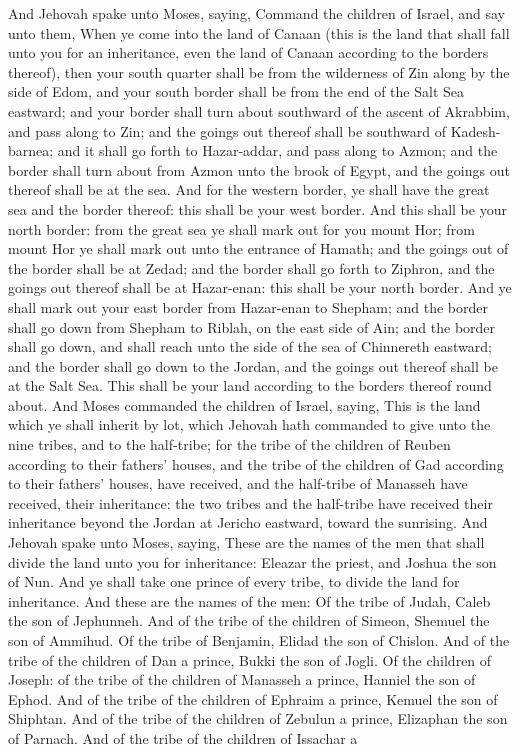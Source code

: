 And Jehovah spake unto Moses, saying, Command the children of Israel, and say unto them, When ye come into the land of Canaan (this is the land that shall fall unto you for an inheritance, even the land of Canaan according to the borders thereof), then your south quarter shall be from the wilderness of Zin along by the side of Edom, and your south border shall be from the end of the Salt Sea eastward; and your border shall turn about southward of the ascent of Akrabbim, and pass along to Zin; and the goings out thereof shall be southward of Kadesh-barnea; and it shall go forth to Hazar-addar, and pass along to Azmon; and the border shall turn about from Azmon unto the brook of Egypt, and the goings out thereof shall be at the sea.  And for the western border, ye shall have the great sea and the border thereof: this shall be your west border.  And this shall be your north border: from the great sea ye shall mark out for you mount Hor; from mount Hor ye shall mark out unto the entrance of Hamath; and the goings out of the border shall be at Zedad; and the border shall go forth to Ziphron, and the goings out thereof shall be at Hazar-enan: this shall be your north border.  And ye shall mark out your east border from Hazar-enan to Shepham; and the border shall go down from Shepham to Riblah, on the east side of Ain; and the border shall go down, and shall reach unto the side of the sea of Chinnereth eastward; and the border shall go down to the Jordan, and the goings out thereof shall be at the Salt Sea. This shall be your land according to the borders thereof round about.  And Moses commanded the children of Israel, saying, This is the land which ye shall inherit by lot, which Jehovah hath commanded to give unto the nine tribes, and to the half-tribe; for the tribe of the children of Reuben according to their fathers’ houses, and the tribe of the children of Gad according to their fathers’ houses, have received, and the half-tribe of Manasseh have received, their inheritance: the two tribes and the half-tribe have received their inheritance beyond the Jordan at Jericho eastward, toward the sunrising.  And Jehovah spake unto Moses, saying, These are the names of the men that shall divide the land unto you for inheritance: Eleazar the priest, and Joshua the son of Nun. And ye shall take one prince of every tribe, to divide the land for inheritance. And these are the names of the men: Of the tribe of Judah, Caleb the son of Jephunneh. And of the tribe of the children of Simeon, Shemuel the son of Ammihud. Of the tribe of Benjamin, Elidad the son of Chislon. And of the tribe of the children of Dan a prince, Bukki the son of Jogli. Of the children of Joseph: of the tribe of the children of Manasseh a prince, Hanniel the son of Ephod. And of the tribe of the children of Ephraim a prince, Kemuel the son of Shiphtan. And of the tribe of the children of Zebulun a prince, Elizaphan the son of Parnach. And of the tribe of the children of Issachar a 